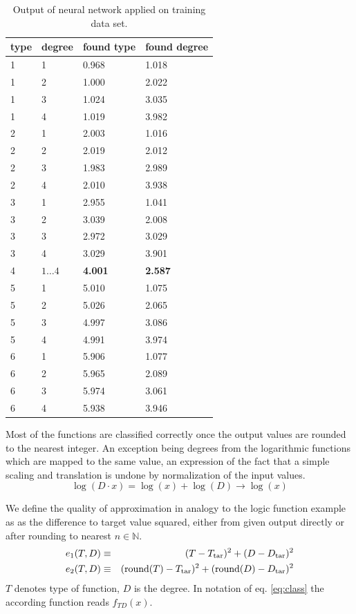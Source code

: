 \documentclass[useAMS,usenatbib]{templates/mn2e}
\begin{document}
\begin{table}
\begin{center}
\begin{tabular}{llll}\hline\hline
type&degree&found type&found degree\\
\hline
1 & 1 & 0.968 & 1.018 \\
1 & 2 & 1.000 & 2.022 \\
1 & 3 & 1.024 & 3.035 \\
1 & 4 & 1.019 & 3.982 \\
\hline
2 & 1 & 2.003 & 1.016 \\
2 & 2 & 2.019 & 2.012 \\
2 & 3 & 1.983 & 2.989 \\
2 & 4 & 2.010 & 3.938 \\
\hline
3 & 1 & 2.955 & 1.041 \\
3 & 2 & 3.039 & 2.008 \\
3 & 3 & 2.972 & 3.029 \\
3 & 4 & 3.029 & 3.901 \\
\hline
4 & $1\ldots4$ & {\bf 4.001} & {\bf 2.587} \\
\hline
5 & 1 & 5.010 & 1.075 \\
5 & 2 & 5.026 & 2.065 \\
5 & 3 & 4.997 & 3.086 \\
5 & 4 & 4.991 & 3.974 \\
\hline
6 & 1 & 5.906 & 1.077 \\
6 & 2 & 5.965 & 2.089 \\
6 & 3 & 5.974 & 3.061 \\
6 & 4 & 5.938 & 3.946 \\
\hline
\end{tabular}
\end{center}
\caption{\label{tab:td1} Output of neural network applied on training data set.}
\end{table}
%
Most of the functions are classified correctly once the output values
are rounded to the nearest integer. An exception being degrees from
the logarithmic functions which are mapped to the same value, an expression
of the fact that a simple scaling and translation is undone
by normalization of the input values.
%
\begin{equation}
  \log(D\cdot x) = \log(x)+\log(D)\to\log(x)
\end{equation}
%

%
We define the quality of approximation in analogy to the logic
function example as as the difference to target value squared, either
from given output directly or after rounding to nearest
$n\in\mathbb{N}$.
%
\begin{eqnarray}
  e_1(T,D)&\equiv&(T-T_{{\rm tar}})^2+(D-D_{{\rm tar}})^2\\
  e_2(T,D)&\equiv&({\rm round}(T)-T_{{\rm tar}})^2+({\rm round}(D)-D_{{\rm tar}})^2
\end{eqnarray}
%
$T$ denotes type of function, $D$ is the degree. In notation of
eq. \ref{eq:class} the according function reads $f_{TD}(x)$.
%
%
\end{document}
